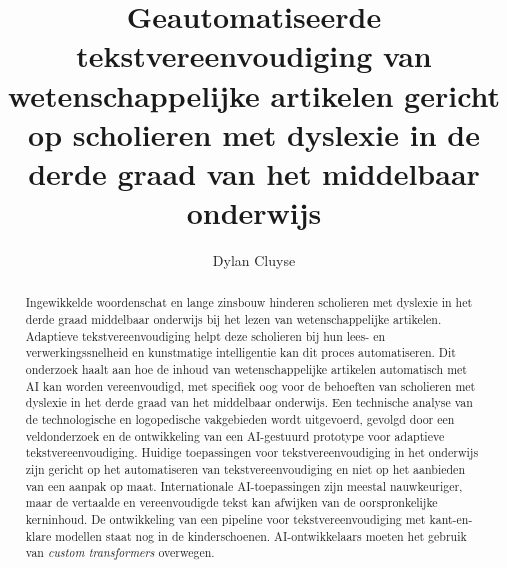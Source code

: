\documentclass{hogent-article}
\title{Geautomatiseerde tekstvereenvoudiging van wetenschappelijke artikelen gericht op scholieren met dyslexie in de derde graad van het middelbaar onderwijs}
\author{Dylan Cluyse}
\begin{document}
	
\begin{abstract}
Ingewikkelde woordenschat en lange zinsbouw hinderen scholieren met dyslexie in het derde graad middelbaar onderwijs bij het lezen van wetenschappelijke artikelen. Adaptieve tekstvereenvoudiging helpt deze scholieren bij hun lees- en verwerkingssnelheid en kunstmatige intelligentie kan dit proces automatiseren. Dit onderzoek haalt aan hoe de inhoud van wetenschappelijke artikelen automatisch  met AI kan worden vereenvoudigd, met specifiek oog voor de behoeften van scholieren met dyslexie in het derde graad van het middelbaar onderwijs. Een technische analyse van de technologische en logopedische vakgebieden wordt uitgevoerd, gevolgd door een veldonderzoek en de ontwikkeling van een AI-gestuurd prototype voor adaptieve tekstvereenvoudiging. Huidige toepassingen voor tekstvereenvoudiging in het onderwijs zijn gericht op het automatiseren van tekstvereenvoudiging en niet op het aanbieden van een aanpak op maat. Internationale AI-toepassingen zijn meestal nauwkeuriger, maar de vertaalde en vereenvoudigde tekst kan afwijken van de oorspronkelijke kerninhoud. De ontwikkeling van een pipeline voor tekstvereenvoudiging met kant-en-klare modellen staat nog in de kinderschoenen. AI-ontwikkelaars moeten het gebruik van \textit{custom transformers} overwegen.
\end{abstract}

\tableofcontents



\printbibliography[heading=bibintoc]
\end{document}
